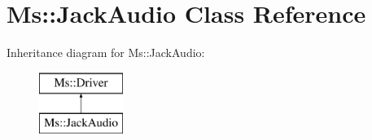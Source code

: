 \hypertarget{class_ms_1_1_jack_audio}{}\section{Ms\+:\+:Jack\+Audio Class Reference}
\label{class_ms_1_1_jack_audio}
Inheritance diagram for Ms\+:\+:Jack\+Audio\+:\begin{figure}[H]
\begin{center}
\leavevmode
\includegraphics[height=2.000000cm]{class_ms_1_1_jack_audio}
\end{center}
\end{figure}
